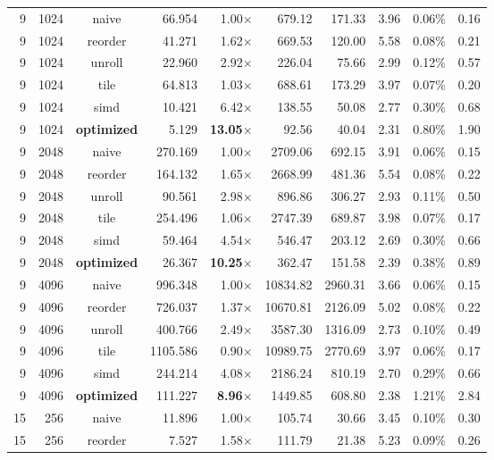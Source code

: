\documentclass[11pt,a4paper]{article}
\begin{document}
{\begin{longtable}{rrcrrrrrrr}
\midrule
9 & 1024 & naive & 66.954 & 1.00$\times$ & 679.12 & 171.33 & 3.96 & 0.06\% & 0.16 \\
9 & 1024 & reorder & 41.271 & 1.62$\times$ & 669.53 & 120.00 & 5.58 & 0.08\% & 0.21 \\
9 & 1024 & unroll & 22.960 & 2.92$\times$ & 226.04 & 75.66 & 2.99 & 0.12\% & 0.57 \\
9 & 1024 & tile & 64.813 & 1.03$\times$ & 688.61 & 173.29 & 3.97 & 0.07\% & 0.20 \\
9 & 1024 & simd & 10.421 & 6.42$\times$ & 138.55 & 50.08 & 2.77 & 0.30\% & 0.68 \\
9 & 1024 & \textbf{optimized} & 5.129 & \textbf{13.05$\times$} & 92.56 & 40.04 & 2.31 & 0.80\% & 1.90 \\
\midrule
9 & 2048 & naive & 270.169 & 1.00$\times$ & 2709.06 & 692.15 & 3.91 & 0.06\% & 0.15 \\
9 & 2048 & reorder & 164.132 & 1.65$\times$ & 2668.99 & 481.36 & 5.54 & 0.08\% & 0.22 \\
9 & 2048 & unroll & 90.561 & 2.98$\times$ & 896.86 & 306.27 & 2.93 & 0.11\% & 0.50 \\
9 & 2048 & tile & 254.496 & 1.06$\times$ & 2747.39 & 689.87 & 3.98 & 0.07\% & 0.17 \\
9 & 2048 & simd & 59.464 & 4.54$\times$ & 546.47 & 203.12 & 2.69 & 0.30\% & 0.66 \\
9 & 2048 & \textbf{optimized} & 26.367 & \textbf{10.25$\times$} & 362.47 & 151.58 & 2.39 & 0.38\% & 0.89 \\
\midrule
9 & 4096 & naive & 996.348 & 1.00$\times$ & 10834.82 & 2960.31 & 3.66 & 0.06\% & 0.15 \\
9 & 4096 & reorder & 726.037 & 1.37$\times$ & 10670.81 & 2126.09 & 5.02 & 0.08\% & 0.22 \\
9 & 4096 & unroll & 400.766 & 2.49$\times$ & 3587.30 & 1316.09 & 2.73 & 0.10\% & 0.49 \\
9 & 4096 & tile & 1105.586 & 0.90$\times$ & 10989.75 & 2770.69 & 3.97 & 0.06\% & 0.17 \\
9 & 4096 & simd & 244.214 & 4.08$\times$ & 2186.24 & 810.19 & 2.70 & 0.29\% & 0.66 \\
9 & 4096 & \textbf{optimized} & 111.227 & \textbf{8.96$\times$} & 1449.85 & 608.80 & 2.38 & 1.21\% & 2.84 \\
\midrule
15 & 256 & naive & 11.896 & 1.00$\times$ & 105.74 & 30.66 & 3.45 & 0.10\% & 0.30 \\
15 & 256 & reorder & 7.527 & 1.58$\times$ & 111.79 & 21.38 & 5.23 & 0.09\% & 0.26 \\

\end{longtable}}
\end{document}
